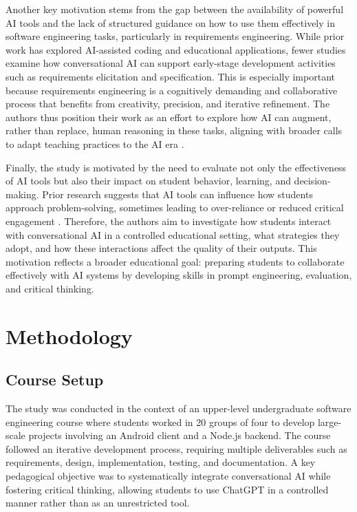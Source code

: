 Another key motivation stems from the gap between the availability of powerful AI tools and the lack of structured guidance on how to use them effectively in software engineering tasks, particularly in requirements engineering. While prior work has explored AI-assisted coding and educational applications, fewer studies examine how conversational AI can support early-stage development activities such as requirements elicitation and specification. This is especially important because requirements engineering is a cognitively demanding and collaborative process that benefits from creativity, precision, and iterative refinement. The authors thus position their work as an effort to explore how AI can augment, rather than replace, human reasoning in these tasks, aligning with broader calls to adapt teaching practices to the AI era \cite{denny2023prompt,becker2023ai}.

Finally, the study is motivated by the need to evaluate not only the effectiveness of AI tools but also their impact on student behavior, learning, and decision-making. Prior research suggests that AI tools can influence how students approach problem-solving, sometimes leading to over-reliance or reduced critical engagement \cite{prather2023ai,kasneci2023chatgpt}. Therefore, the authors aim to investigate how students interact with conversational AI in a controlled educational setting, what strategies they adopt, and how these interactions affect the quality of their outputs. This motivation reflects a broader educational goal: preparing students to collaborate effectively with AI systems by developing skills in prompt engineering, evaluation, and critical thinking.

\section{Methodology}
\subsection{Course Setup}
The study was conducted in the context of an upper-level undergraduate software engineering course where students worked in 20 groups of four to develop large-scale projects involving an Android client and a Node.js backend. The course followed an iterative development process, requiring multiple deliverables such as requirements, design, implementation, testing, and documentation. A key pedagogical objective was to systematically integrate conversational AI while fostering critical thinking, allowing students to use ChatGPT in a controlled manner rather than as an unrestricted tool.

